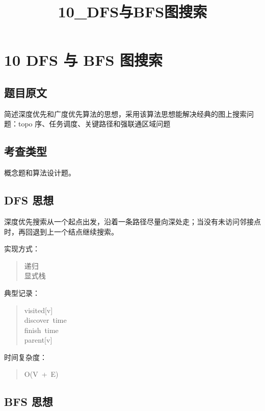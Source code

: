 \documentclass[UTF8,zihao=-4]{ctexart}
\title{10\_DFS与BFS图搜索}
\author{}
\date{}
\begin{document}
\maketitle

\section*{10 DFS 与 BFS 图搜索}

\subsection*{题目原文}

简述深度优先和广度优先算法的思想，采用该算法思想能解决经典的图上搜索问题：topo 序、任务调度、关键路径和强联通区域问题

\subsection*{考查类型}

概念题和算法设计题。

\subsection*{DFS 思想}

深度优先搜索从一个起点出发，沿着一条路径尽量向深处走；当没有未访问邻接点时，再回退到上一个结点继续搜索。

实现方式：

\begin{quote}
\small\ttfamily\raggedright
\relax 递归\\
\relax 显式栈\\
\end{quote}

典型记录：

\begin{quote}
\small\ttfamily\raggedright
\relax visited[v]\\
\relax discover\ time\\
\relax finish\ time\\
\relax parent[v]\\
\end{quote}

时间复杂度：

\begin{quote}
\small\ttfamily\raggedright
\relax O(V\ +\ E)\\
\end{quote}

\subsection*{BFS 思想}
\end{document}
